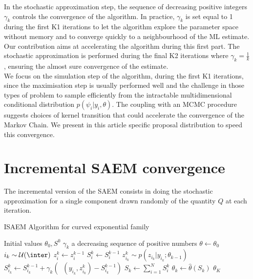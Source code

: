 \documentclass[a4paper]{article}
\theoremstyle{plain}
\DeclareMathOperator*{\St}{\tilde{S}}
\theoremstyle{plain}
\theoremstyle{definition}
\begin{document}
In the stochastic approximation step, the sequence of decreasing positive integers $\gamma_k$ controls the convergence of the algorithm. In practice, $\gamma_k$ is set equal to 1 during the first K1 iterations to let the algorithm explore the parameter space without memory and to converge quickly to a neighbourhood of the ML estimate. Our contribution aims at accelerating the algorithm during this first part. The stochastic approximation is performed during the final K2 iterations where $\gamma_k = \frac{1}{k}$, ensuring the almost sure convergence of the estimate.\\
We focus on the simulation step of the algorithm, during the first K1 iterations, since the maximisation step is usually performed well and the challenge in those types of problem to sample efficiently from the intractable multidimensional conditional distribution $p(\psi_i|y_i,\theta)$. The coupling with an MCMC procedure suggests choices of kernel transition that could accelerate the convergence of the Markov Chain. We present in this article specific proposal distribution to speed this convergence.\\

\section{Incremental SAEM convergence}
The incremental version of the SAEM consists in doing the stochastic approximation for a single component drawn randomly of the quantity $Q$ at each iteration.


\begin{algorithm}
\caption{ISAEM Algorithm for curved exponential family}
\label{pseudoISAEM}
\begin{algorithmic}[1]
\State Initial values $\theta_0, S^0$
\State $\gamma_k$ a decreasing sequence of positive numbers
\State $\theta \gets \theta_0$
\State $i_{k} \sim  \mathcal{U}(\inter)$
      	\State $z_i^{k} \gets z_i^{k-1}$
        \State $S_i^{k} \gets S_i^{k-1}$
      \Else
        \State $z_{i_{k}}^{k} \sim p(z_{i_{k}}|y_{i_{k}}; \theta_{k-1})$
        \State $S_{i_{k}}^{k} \gets S_{i_{k}}^{k-1} + \gamma_k (\St(y_{i_k},z_{i_{k}}^{k})-S_{i_{k}}^{k-1})$
      \EndIf
      \State $S_{k} \gets \sum_{i=1}^{N}{S_i^k}$  
        \State $\theta_{k} \gets \hat{\theta}(S_{k})$  
\EndFor  
\State \Return $\theta_{K}$
\end{algorithmic}
\end{algorithm}
\end{document}
